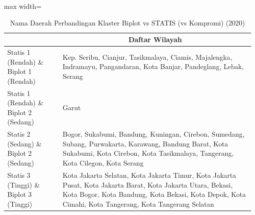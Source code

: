\begin{table}[H]
\centering
\caption{Nama Daerah Perbandingan Klaster Biplot vs STATIS (vs Kompromi) (2020)} \label{tab:app1biplot_statis_name_2020}
\begin{adjustbox}{max width=\textwidth}
\begin{tabular}{|>{\centering\arraybackslash}p{4cm}|p{10cm}|}
\hline
\multicolumn{1}{|c|}{\textbf{Kategori}} & \multicolumn{1}{c|}{\textbf{Daftar Wilayah}} \\
\hline
Statis 1 (Rendah) \& Biplot 1 (Rendah) & Kep. Seribu, Cianjur, Tasikmalaya, Ciamis, Majalengka, Indramayu, Pangandaran, Kota Banjar, Pandeglang, Lebak, Serang \\
\hline
Statis 1 (Rendah) \& Biplot 2 (Sedang) & Garut \\
\hline
Statis 2 (Sedang) \& Biplot 2 (Sedang) & Bogor, Sukabumi, Bandung, Kuningan, Cirebon, Sumedang, Subang, Purwakarta, Karawang, Bandung Barat, Kota Sukabumi, Kota Cirebon, Kota Tasikmalaya, Tangerang, Kota Cilegon, Kota Serang \\
\hline
Statis 3 (Tinggi) \& Biplot 3 (Tinggi) & Kota Jakarta Selatan, Kota Jakarta Timur, Kota Jakarta Pusat, Kota Jakarta Barat, Kota Jakarta Utara, Bekasi, Kota Bogor, Kota Bandung, Kota Bekasi, Kota Depok, Kota Cimahi, Kota Tangerang, Kota Tangerang Selatan \\
\hline
\end{tabular}
\end{adjustbox}
\end{table}